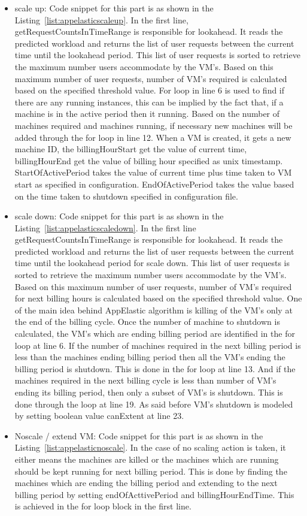 \begin{itemize}
  \item scale up: Code snippet for this part is as shown in the Listing~\ref{list:appelasticscaleup}. In the first line, getRequestCountsInTimeRange is responsible for lookahead. It reads the predicted workload and returns the list of user requests between the current time until the lookahead period. This list of user requests is sorted to retrieve the maximum number users accommodate by the VM's. Based on this maximum number of user requests, number of VM's required is calculated based on the specified threshold value.  For loop in line 6 is used to find if there are any running instances, this can be implied by the fact that, if a machine is in the active period then it running.
  Based on the number of machines required and machines running, if necessary new machines will be added through the for loop in line 12.  When a VM is created, it gets a new machine ID, the  billingHourStart get the value of current time,  billingHourEnd get the value of billing hour specified as unix timestamp.  StartOfActivePeriod takes the value of current time plus time taken to VM start as specified in configuration. EndOfActivePeriod takes the value based on the time taken to shutdown specified in configuration file.
  \item scale down:  Code snippet for this part is as shown in the Listing~\ref{list:appelasticscaledown}.  In the first line getRequestCountsInTimeRange is responsible for lookahead. It reads the predicted workload and returns the list of user requests between the current time until the lookahead period for scale down. This list of user requests is sorted to retrieve the maximum number users accommodate by the VM's. Based on this maximum number of user requests, number of VM's required for next billing hours is calculated based on the specified threshold value. One of the main idea behind AppElastic algorithm is killing of the VM's only at the end of the billing cycle. Once the number of machine to shutdown is calculated, the VM's which are ending billing period are identified in the for loop at line 6. If the number of machines required in the next billing period is less than the machines ending billing period then all the VM's ending the billing period is shutdown. This is done in the for loop at line 13. And if the machines required in the next billing cycle is less than number of VM's ending its billing period, then only  a subset of VM's is shutdown. This is done through the loop at line 19.  As said before VM's shutdown is modeled by setting boolean value canExtent at line 23.
  \item Noscale / extend VM:  Code snippet for this part is as shown in the Listing~\ref{list:appelasticnoscale}.  In the case of no scaling action is taken, it either means the machines are killed or the machines which are running should be kept running for next billing period. This is done by finding the machines which are ending the billing period and extending to the next billing period by setting endOfActtivePeriod and billingHourEndTime. This is achieved in the for loop block in the first line.
\end{itemize}
